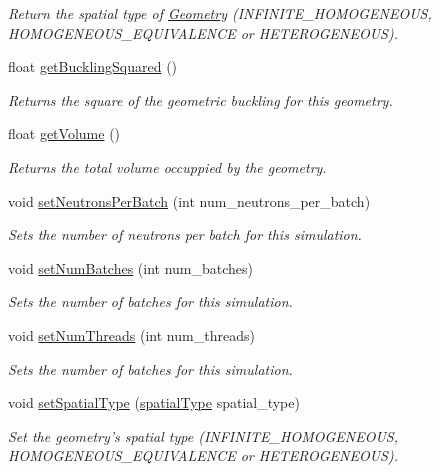 \begin{DoxyCompactItemize}
\begin{DoxyCompactList}\small\item\em Return the spatial type of \hyperlink{classGeometry}{Geometry} (I\-N\-F\-I\-N\-I\-T\-E\-\_\-\-H\-O\-M\-O\-G\-E\-N\-E\-O\-U\-S, H\-O\-M\-O\-G\-E\-N\-E\-O\-U\-S\-\_\-\-E\-Q\-U\-I\-V\-A\-L\-E\-N\-C\-E or H\-E\-T\-E\-R\-O\-G\-E\-N\-E\-O\-U\-S). \end{DoxyCompactList}\item 
float \hyperlink{classGeometry_a662e458bc59ac8390e0c07cea3ab0be8}{get\-Buckling\-Squared} ()
\begin{DoxyCompactList}\small\item\em Returns the square of the geometric buckling for this geometry. \end{DoxyCompactList}\item 
float \hyperlink{classGeometry_a982427d7ad500c703b5348f455b7dced}{get\-Volume} ()
\begin{DoxyCompactList}\small\item\em Returns the total volume occuppied by the geometry. \end{DoxyCompactList}\item 
void \hyperlink{classGeometry_a0160e8eef8ecd7655dc2ddc8f7a46391}{set\-Neutrons\-Per\-Batch} (int num\-\_\-neutrons\-\_\-per\-\_\-batch)
\begin{DoxyCompactList}\small\item\em Sets the number of neutrons per batch for this simulation. \end{DoxyCompactList}\item 
void \hyperlink{classGeometry_ab78e778d1362e38dd9e02514e7ee7019}{set\-Num\-Batches} (int num\-\_\-batches)
\begin{DoxyCompactList}\small\item\em Sets the number of batches for this simulation. \end{DoxyCompactList}\item 
void \hyperlink{classGeometry_a657cb04b0e42bc9a1574a9120c5a6e67}{set\-Num\-Threads} (int num\-\_\-threads)
\begin{DoxyCompactList}\small\item\em Sets the number of batches for this simulation. \end{DoxyCompactList}\item 
void \hyperlink{classGeometry_a52ab88674bf4f90db4fab0899f326a58}{set\-Spatial\-Type} (\hyperlink{Geometry_8h_af321382c4a8d9fdb71c83382f82fac00}{spatial\-Type} spatial\-\_\-type)
\begin{DoxyCompactList}\small\item\em Set the geometry's spatial type (I\-N\-F\-I\-N\-I\-T\-E\-\_\-\-H\-O\-M\-O\-G\-E\-N\-E\-O\-U\-S, H\-O\-M\-O\-G\-E\-N\-E\-O\-U\-S\-\_\-\-E\-Q\-U\-I\-V\-A\-L\-E\-N\-C\-E or H\-E\-T\-E\-R\-O\-G\-E\-N\-E\-O\-U\-S). \end{DoxyCompactList}\item 

\end{DoxyCompactItemize}
